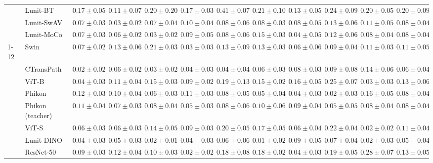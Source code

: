 \begin{tabular}{ll|cccc|c|cccc|c}
 & Lunit-BT & $0.17 \pm 0.05$ & $0.11 \pm 0.07$ & $0.20 \pm 0.20$ & $0.17 \pm 0.03$ & $0.41 \pm 0.07$ & $0.21 \pm 0.10$ & $0.13 \pm 0.05$ & $0.24 \pm 0.09$ & $0.20 \pm 0.05$ & $0.20 \pm 0.09$ \\
 & Lunit-SwAV & $0.07 \pm 0.03$ & $0.03 \pm 0.02$ & $0.07 \pm 0.04$ & $0.10 \pm 0.04$ & $0.08 \pm 0.06$ & $0.08 \pm 0.03$ & $0.08 \pm 0.05$ & $0.13 \pm 0.06$ & $0.11 \pm 0.05$ & $0.08 \pm 0.04$ \\
 & Lunit-MoCo & $0.07 \pm 0.03$ & $0.06 \pm 0.02$ & $0.03 \pm 0.02$ & $0.09 \pm 0.05$ & $0.08 \pm 0.06$ & $0.15 \pm 0.03$ & $\mathbf{0.04 \pm 0.05}$ & $0.12 \pm 0.06$ & $0.08 \pm 0.04$ & $0.08 \pm 0.04$ \\
\cline{1-12}
\multirow[t]{12}{*}{Transformer} & Swin & $0.07 \pm 0.02$ & $0.13 \pm 0.06$ & $0.21 \pm 0.03$ & $0.03 \pm 0.03$ & $0.13 \pm 0.09$ & $0.13 \pm 0.03$ & $0.06 \pm 0.06$ & $0.09 \pm 0.04$ & $0.11 \pm 0.03$ & $0.11 \pm 0.05$ \\
 & CTransPath & $\mathbf{0.02 \pm 0.02}$ & $0.06 \pm 0.02$ & $0.03 \pm 0.02$ & $0.04 \pm 0.03$ & $\mathbf{0.04 \pm 0.04}$ & $0.06 \pm 0.03$ & $0.08 \pm 0.03$ & $0.09 \pm 0.08$ & $0.14 \pm 0.06$ & $0.06 \pm 0.04$ \\
 & ViT-B & $0.04 \pm 0.03$ & $0.11 \pm 0.04$ & $0.15 \pm 0.03$ & $0.09 \pm 0.02$ & $0.19 \pm 0.13$ & $0.15 \pm 0.02$ & $0.16 \pm 0.05$ & $0.25 \pm 0.07$ & $0.03 \pm 0.03$ & $0.13 \pm 0.06$ \\
 & Phikon & $0.12 \pm 0.03$ & $0.10 \pm 0.04$ & $0.06 \pm 0.03$ & $0.11 \pm 0.03$ & $0.08 \pm 0.05$ & $0.05 \pm 0.04$ & $0.04 \pm 0.03$ & $\mathbf{0.02 \pm 0.03}$ & $0.16 \pm 0.05$ & $0.08 \pm 0.04$ \\
 & Phikon (teacher) & $0.11 \pm 0.04$ & $0.07 \pm 0.03$ & $0.08 \pm 0.04$ & $0.05 \pm 0.03$ & $0.08 \pm 0.06$ & $0.10 \pm 0.06$ & $0.09 \pm 0.04$ & $0.05 \pm 0.05$ & $0.08 \pm 0.04$ & $0.08 \pm 0.04$ \\
 & ViT-S & $0.06 \pm 0.03$ & $0.06 \pm 0.03$ & $0.14 \pm 0.05$ & $0.09 \pm 0.03$ & $0.20 \pm 0.05$ & $0.17 \pm 0.05$ & $0.06 \pm 0.04$ & $0.22 \pm 0.04$ & $\mathbf{0.02 \pm 0.02}$ & $0.11 \pm 0.04$ \\
 & Lunit-DINO & $0.04 \pm 0.03$ & $0.05 \pm 0.03$ & $0.02 \pm 0.01$ & $0.04 \pm 0.03$ & $0.06 \pm 0.06$ & $\mathbf{0.01 \pm 0.02}$ & $0.09 \pm 0.05$ & $0.07 \pm 0.04$ & $0.02 \pm 0.03$ & $\mathbf{0.05 \pm 0.04}$ \\
 & ResNet-50 & $0.09 \pm 0.03$ & $0.12 \pm 0.04$ & $0.10 \pm 0.03$ & $\mathbf{0.02 \pm 0.02}$ & $0.18 \pm 0.08$ & $0.18 \pm 0.02$ & $0.04 \pm 0.03$ & $0.19 \pm 0.05$ & $0.28 \pm 0.07$ & $0.13 \pm 0.05$ \\

\end{tabular}
